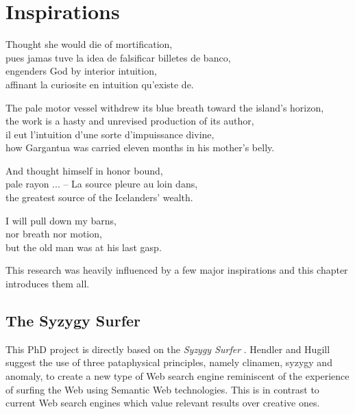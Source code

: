 
\chapter{Inspirations}
\label{ch:inspirations}

\startcontents[chapters]

\vfill

Thought she would die of mortification, \\
pues jamas tuve la idea de falsificar billetes de banco, \\
engenders God by interior intuition, \\
affinant la curiosite en intuition qu'existe de.

The pale motor vessel withdrew its blue breath toward the island's horizon, \\
the work is a hasty and unrevised production of its author, \\
il eut l'intuition d'une sorte d'impuissance divine, \\
how Gargantua was carried eleven months in his mother's belly.

And thought himself in honor bound, \\
pale rayon ... -- La source pleure au loin dans, \\
the greatest source of the Icelanders' wealth.

I will pull down my barns, \\
nor breath nor motion, \\
but the old man was at his last gasp.

\newpage
\minicontents
\spirals

This research was heavily influenced by a few major inspirations and this chapter introduces them all.


\section{The Syzygy Surfer}
\label{s:surfer}

This PhD project is directly based on the \emph{Syzygy Surfer} \autocite{Hendler2011, Hendler2013}. Hendler and Hugill suggest the use of three pataphysical principles, namely clinamen, syzygy and anomaly, to create a new type of Web search engine reminiscent of the experience of surfing the Web using Semantic Web technologies. This is in contrast to current Web search engines which value relevant results over creative ones.

